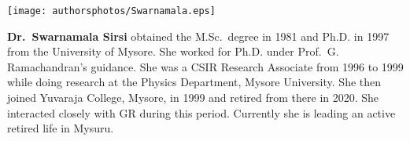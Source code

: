 \centerline{\texttt{[image: authorsphotos/Swarnamala.eps]}}
\bigskip

\noindent
\textbf{Dr.\ Swarnamala Sirsi} obtained the M.Sc.\ degree in 1981 and Ph.D. in 1997 from the University of Mysore. She worked for Ph.D. under Prof.\ G. Ramachandran’s guidance. She was a CSIR Research Associate from 1996 to 1999 while doing research at the Physics Department, Mysore University. She then joined Yuvaraja College, Mysore, in 1999 and retired from there in 2020. She interacted closely with GR during this period. Currently she is leading an active retired life in Mysuru.
